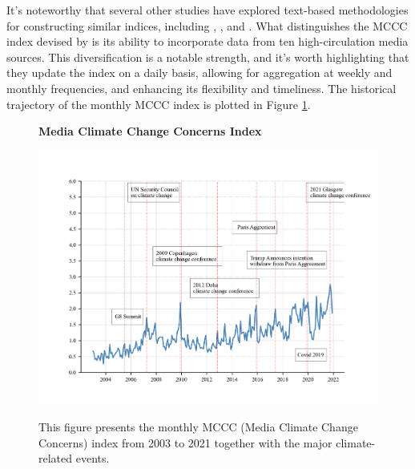 \documentclass[12pt]{article}
\begin{document}
It's noteworthy that several other studies have explored text-based methodologies for constructing similar indices, including \cite{engle2020hedging}, \cite{kapfhammer2020climate}, and \cite{faccini2021climate}. What distinguishes the MCCC index devised by \cite{ardia2022climate} is its ability to incorporate data from ten high-circulation media sources. This diversification is a notable strength, and it's worth highlighting that they update the index on a daily basis, allowing for aggregation at weekly and monthly frequencies, and enhancing its flexibility and timeliness. The historical trajectory of the monthly MCCC index is plotted in Figure \ref{fig: mccc}.

\begin{figure}[!ht]
\centering
\caption{\textbf{Media Climate Change Concerns Index}}
\includegraphics{graphics/mccc.png}
\label{fig: mccc}
\caption*{\footnotesize{This figure presents the monthly MCCC (Media Climate Change Concerns) index from 2003 to 2021 together with the major climate-related events.}}
\end{figure}
\end{document}
